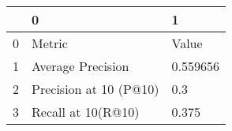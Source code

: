 \begin{tabular}{lll}
\toprule
{} &                       0 &         1 \\
\midrule
0 &                  Metric &     Value \\
1 &       Average Precision &  0.559656 \\
2 &  Precision at 10 (P@10) &       0.3 \\
3 &      Recall at 10(R@10) &     0.375 \\
\bottomrule
\end{tabular}
